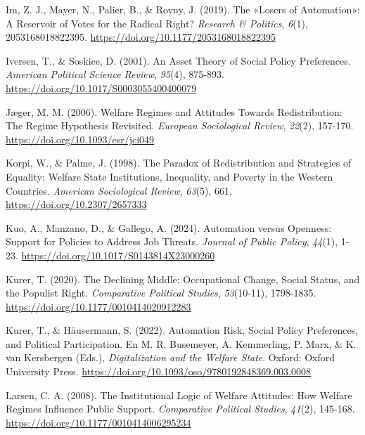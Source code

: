 \documentclass[
  spanish,
  12pt,
]{article}
\newlength{\cslhangindent}
\newenvironment{CSLReferences}[2] %
 {\begin{list}{}{%
  \setlength{\itemindent}{0pt}
  \setlength{\leftmargin}{0pt}
  \setlength{\parsep}{0pt}
  \ifodd #1
   \setlength{\leftmargin}{\cslhangindent}
   \setlength{\itemindent}{-1\cslhangindent}
  \fi
  \setlength{\itemsep}{#2\baselineskip}}}
 {\end{list}}
\begin{document}
\begin{CSLReferences}{1}{0}
Im, Z. J., Mayer, N., Palier, B., \& Rovny, J. (2019). The {«Losers of
Automation»}: {A} Reservoir of Votes for the Radical Right?
\emph{Research \& Politics}, \emph{6}(1), 2053168018822395.
\url{https://doi.org/10.1177/2053168018822395}

Iversen, T., \& Soskice, D. (2001). An {Asset Theory} of {Social Policy
Preferences}. \emph{American Political Science Review}, \emph{95}(4),
875-893. \url{https://doi.org/10.1017/S0003055400400079}

Jæger, M. M. (2006). Welfare {Regimes} and {Attitudes Towards
Redistribution}: {The Regime Hypothesis Revisited}. \emph{European
Sociological Review}, \emph{22}(2), 157-170.
\url{https://doi.org/10.1093/esr/jci049}

Korpi, W., \& Palme, J. (1998). The {Paradox} of {Redistribution} and
{Strategies} of {Equality}: {Welfare State Institutions}, {Inequality},
and {Poverty} in the {Western Countries}. \emph{American Sociological
Review}, \emph{63}(5), 661. \url{https://doi.org/10.2307/2657333}

Kuo, A., Manzano, D., \& Gallego, A. (2024). Automation versus Openness:
{Support} for Policies to Address Job Threats. \emph{Journal of Public
Policy}, \emph{44}(1), 1-23.
\url{https://doi.org/10.1017/S0143814X23000260}

Kurer, T. (2020). The {Declining Middle}: {Occupational Change}, {Social
Status}, and the {Populist Right}. \emph{Comparative Political Studies},
\emph{53}(10-11), 1798-1835.
\url{https://doi.org/10.1177/0010414020912283}

Kurer, T., \& Häusermann, S. (2022). Automation Risk, Social Policy
Preferences, and Political Participation. En {M. R. Busemeyer, A.
Kemmerling, P. Marx, \& K. van Kersbergen (Eds.)}, \emph{Digitalization
and the Welfare State}. Oxford: Oxford University Press.
\url{https://doi.org/10.1093/oso/9780192848369.003.0008}

Larsen, C. A. (2008). The {Institutional Logic} of {Welfare Attitudes}:
{How Welfare Regimes Influence Public Support}. \emph{Comparative
Political Studies}, \emph{41}(2), 145-168.
\url{https://doi.org/10.1177/0010414006295234}


\end{CSLReferences}
\end{document}
